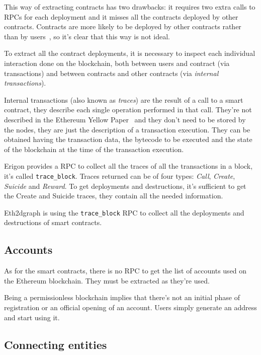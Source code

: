 This way of extracting contracts has two drawbacks: it requires two extra calls to RPCs for each deployment and it misses all the contracts deployed by other contracts. Contracts are more likely to be deployed by other contracts rather than by users~\cite{ethereum-sc-topology}, so it's clear that this way is not ideal.

To extract all the contract deployments, it is necessary to inspect each individual interaction done on the blockchain, both between users and contract (via transactions) and between contracts and other contracts (via \textit{internal transactions}). 

Internal transactions (also known as \textit{traces}) are the result of a call to a smart contract, they describe each single operation performed in that call. They're not described in the Ethereum Yellow Paper~\cite{ethereum-yellow} and they don't need to be stored by the nodes, they are just the description of a transaction execution. They can be obtained having the transaction data, the bytecode to be executed and the state of the blockchain at the time of the transaction execution.

Erigon provides a RPC to collect all the traces of all the transactions in a block, it's called \texttt{trace\_block}. Traces returned can be of four types: \textit{Call}, \textit{Create}, \textit{Suicide} and \textit{Reward}. To get deployments and destructions, it's sufficient to get the Create and Suicide traces, they contain all the needed information.

Eth2dgraph is using the \texttt{trace\_block} RPC to collect all the deployments and destructions of smart contracts.

\subsection{Accounts}

As for the smart contracts, there is no RPC to get the list of accounts used on the Ethereum blockchain. They must be extracted as they're used.

Being a permissionless blockchain implies that there's not an initial phase of registration or an official opening of an account. Users simply generate an address and start using it. 



\subsection{Connecting entities}

